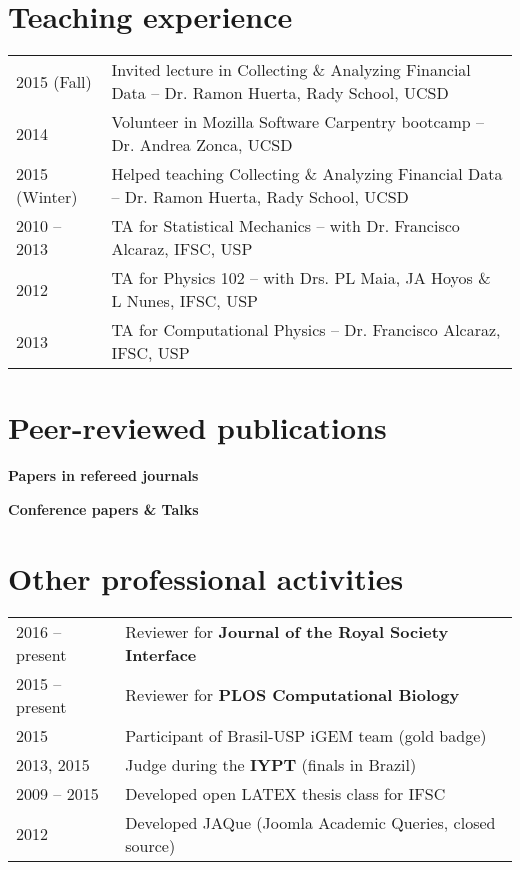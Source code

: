 \documentclass[letter,10pt]{article} %
\begin{document}
\section{Teaching experience}

\begin{longtable}{p{2.5cm}p{15cm}}
  2015 (Fall) & Invited lecture in Collecting \& Analyzing Financial Data -- Dr. Ramon Huerta, Rady School, UCSD \\
  2014 & Volunteer in Mozilla Software Carpentry bootcamp  -- Dr. Andrea Zonca, UCSD \\
  2015 (Winter) & Helped teaching Collecting \& Analyzing Financial Data -- Dr. Ramon Huerta, Rady School, UCSD \\
  2010 -- 2013  & TA for Statistical Mechanics -- with Dr. Francisco Alcaraz, IFSC, USP \\
  2012  & TA for Physics 102 -- with Drs. PL Maia, JA Hoyos \& L Nunes, IFSC, USP \\
  2013  & TA for Computational Physics -- Dr. Francisco Alcaraz, IFSC, USP
\end{longtable}

\section{Peer-reviewed publications}

\nocite{*}

{\bf Papers in refereed journals}
\printbibliography[type=article]

{\bf Conference papers \& Talks}
\printbibliography[type=inproceedings]


\section{Other professional activities}

\begin{longtable}{p{2.5cm}p{15cm}}
  2016 -- present  & Reviewer for {\bf Journal of the Royal Society Interface} \\
  2015 -- present  & Reviewer for {\bf PLOS Computational Biology} \\
  2015 & Participant of Brasil-USP iGEM team (gold badge)\\
  2013, 2015  & Judge during the {\bf IYPT} (finals in Brazil) \\
  2009 -- 2015 & Developed open LATEX thesis class for IFSC \\
  2012 & Developed JAQue (Joomla Academic Queries, closed source)
\end{longtable}
\end{document}
